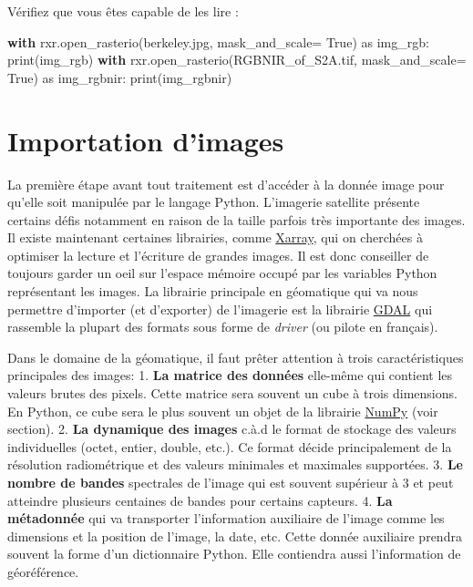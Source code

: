 \documentclass[
  11pt,
  letterpaper,
  open=any,
  twoside=false,
  french]{scrbook}
\newenvironment{Shaded}{\begin{snugshade}}{\end{snugshade}}
\newcommand{\BuiltInTok}[1]{\textcolor[rgb]{0.00,0.23,0.31}{#1}}
\newcommand{\ControlFlowTok}[1]{\textcolor[rgb]{0.00,0.23,0.31}{\textbf{#1}}}
\newcommand{\ImportTok}[1]{\textcolor[rgb]{0.00,0.46,0.62}{#1}}
\newcommand{\NormalTok}[1]{\textcolor[rgb]{0.00,0.23,0.31}{#1}}
\newcommand{\OperatorTok}[1]{\textcolor[rgb]{0.37,0.37,0.37}{#1}}
\newcommand{\StringTok}[1]{\textcolor[rgb]{0.13,0.47,0.30}{#1}}
\newcommand{\VariableTok}[1]{\textcolor[rgb]{0.07,0.07,0.07}{#1}}
\begin{document}
Vérifiez que vous êtes capable de les lire :

\begin{Shaded}
\begin{Highlighting}[]
\ControlFlowTok{with}\NormalTok{ rxr.open\_rasterio(}\StringTok{\textquotesingle{}berkeley.jpg\textquotesingle{}}\NormalTok{, mask\_and\_scale}\OperatorTok{=} \VariableTok{True}\NormalTok{) }\ImportTok{as}\NormalTok{ img\_rgb:}
    \BuiltInTok{print}\NormalTok{(img\_rgb)}
\ControlFlowTok{with}\NormalTok{ rxr.open\_rasterio(}\StringTok{\textquotesingle{}RGBNIR\_of\_S2A.tif\textquotesingle{}}\NormalTok{, mask\_and\_scale}\OperatorTok{=} \VariableTok{True}\NormalTok{) }\ImportTok{as}\NormalTok{ img\_rgbnir:}
    \BuiltInTok{print}\NormalTok{(img\_rgbnir)}
\end{Highlighting}
\end{Shaded}

\section{Importation d'images}\label{importation-dimages}

La première étape avant tout traitement est d'accéder à la donnée image
pour qu'elle soit manipulée par le langage Python. L'imagerie satellite
présente certains défis notamment en raison de la taille parfois très
importante des images. Il existe maintenant certaines librairies, comme
\href{https://docs.xarray.dev/en/stable/}{Xarray}, qui on cherchées à
optimiser la lecture et l'écriture de grandes images. Il est donc
conseiller de toujours garder un oeil sur l'espace mémoire occupé par
les variables Python représentant les images. La librairie principale en
géomatique qui va nous permettre d'importer (et d'exporter) de
l'imagerie est la librairie \href{https://gdal.org}{GDAL} qui rassemble
la plupart des formats sous forme de \emph{driver} (ou pilote en
français).

Dans le domaine de la géomatique, il faut prêter attention à trois
caractéristiques principales des images: 1. \textbf{La matrice des
données} elle-même qui contient les valeurs brutes des pixels. Cette
matrice sera souvent un cube à trois dimensions. En Python, ce cube sera
le plus souvent un objet de la librairie
\href{https://numpy.org/}{NumPy} (voir section). 2. \textbf{La dynamique
des images} c.à.d le format de stockage des valeurs individuelles
(octet, entier, double, etc.). Ce format décide principalement de la
résolution radiométrique et des valeurs minimales et maximales
supportées. 3. \textbf{Le nombre de bandes} spectrales de l'image qui
est souvent supérieur à 3 et peut atteindre plusieurs centaines de
bandes pour certains capteurs. 4. \textbf{La métadonnée} qui va
transporter l'information auxiliaire de l'image comme les dimensions et
la position de l'image, la date, etc. Cette donnée auxiliaire prendra
souvent la forme d'un dictionnaire Python. Elle contiendra aussi
l'information de géoréférence.
\end{document}
